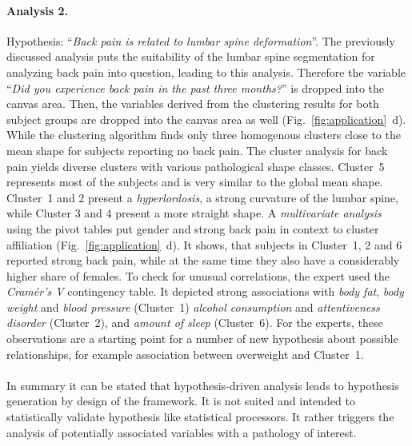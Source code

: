 \documentclass[journal]{style/vgtc} 			          %
\begin{document}
\paragraph{Analysis 2.}
Hypothesis: ``\emph{Back pain is related to lumbar spine deformation}''.
%
The previously discussed analysis puts the suitability of the lumbar spine segmentation for analyzing back pain into question, leading to this analysis.
%
Therefore the variable ``\emph{Did you experience back pain in the past three months?}'' is dropped into the canvas area. %
%
Then, the variables derived from the clustering results for both subject groups are dropped into the canvas area as well (Fig.~\ref{fig:application}~d).
%
While the clustering algorithm finds only three homogenous clusters close to the mean shape for subjects reporting no back pain.
%
The cluster analysis for back pain yields diverse clusters with various pathological shape classes.
%
Cluster~5 represents most of the subjects and is very similar to the global mean shape.
%
Cluster~1 and 2 present a \emph{hyperlordosis}, a strong curvature of the lumbar spine, while Cluster 3 and 4 present a more straight shape.
%
A \emph{multivariate analysis} using the pivot tables put gender and strong back pain in context to cluster affiliation (Fig.~\ref{fig:application}~d). 
%
It shows, that subjects in Cluster~1, 2 and 6 reported strong back pain, while at the same time they also have a considerably higher share of females.
%
To check for unusual correlations, the expert used the \emph{Cram\'{e}r's V} contingency table.
%
It depicted strong associations with \emph{body fat}, \emph{body weight} and \emph{blood pressure} (Cluster~1) \emph{alcohol consumption} and \emph{attentiveness disorder} (Cluster~2), and \emph{amount of sleep} (Cluster~6).
%
For the experts, these observations are a starting point for a number of new hypothesis about possible relationships, for example association between overweight and Cluster~1.
%
\\\\
In summary it can be stated that hypothesis-driven analysis leads to hypothesis generation by design of the framework.
%
It is not suited and intended to statistically validate hypothesis like statistical processors.
%
It rather triggers the analysis of potentially associated variables with a pathology of interest.
%
\end{document}
